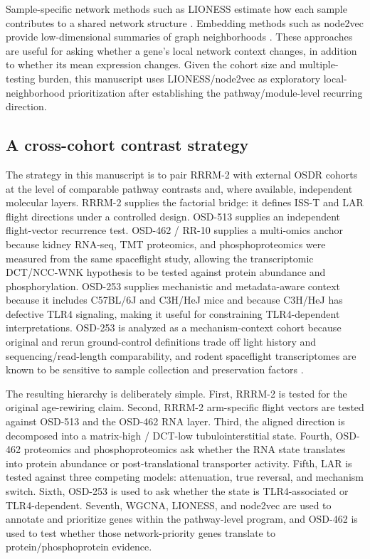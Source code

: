 \documentclass[11pt]{article}
\begin{document}
Sample-specific network methods such as LIONESS estimate how each sample contributes to a shared network structure \citep{kuijjer2019estimating}. Embedding methods such as node2vec provide low-dimensional summaries of graph neighborhoods \citep{grover2016node2vec}. These approaches are useful for asking whether a gene's local network context changes, in addition to whether its mean expression changes. Given the cohort size and multiple-testing burden, this manuscript uses LIONESS/node2vec as exploratory local-neighborhood prioritization after establishing the pathway/module-level recurring direction.

\subsection{A cross-cohort contrast strategy}

The strategy in this manuscript is to pair RRRM-2 with external OSDR cohorts at the level of comparable pathway contrasts and, where available, independent molecular layers. RRRM-2 supplies the factorial bridge: it defines ISS-T and LAR flight directions under a controlled design. OSD-513 supplies an independent flight-vector recurrence test. OSD-462 / RR-10 supplies a multi-omics anchor because kidney RNA-seq, TMT proteomics, and phosphoproteomics were measured from the same spaceflight study, allowing the transcriptomic DCT/NCC-WNK hypothesis to be tested against protein abundance and phosphorylation. OSD-253 supplies mechanistic and metadata-aware context because it includes C57BL/6J and C3H/HeJ mice and because C3H/HeJ has defective TLR4 signaling, making it useful for constraining TLR4-dependent interpretations. OSD-253 is analyzed as a mechanism-context cohort because original and rerun ground-control definitions trade off light history and sequencing/read-length comparability, and rodent spaceflight transcriptomes are known to be sensitive to sample collection and preservation factors \citep{galazka2020rnaseq,preserve2016}.

The resulting hierarchy is deliberately simple. First, RRRM-2 is tested for the original age-rewiring claim. Second, RRRM-2 arm-specific flight vectors are tested against OSD-513 and the OSD-462 RNA layer. Third, the aligned direction is decomposed into a matrix-high / DCT-low tubulointerstitial state. Fourth, OSD-462 proteomics and phosphoproteomics ask whether the RNA state translates into protein abundance or post-translational transporter activity. Fifth, LAR is tested against three competing models: attenuation, true reversal, and mechanism switch. Sixth, OSD-253 is used to ask whether the state is TLR4-associated or TLR4-dependent. Seventh, WGCNA, LIONESS, and node2vec are used to annotate and prioritize genes within the pathway-level program, and OSD-462 is used to test whether those network-priority genes translate to protein/phosphoprotein evidence.
\end{document}
